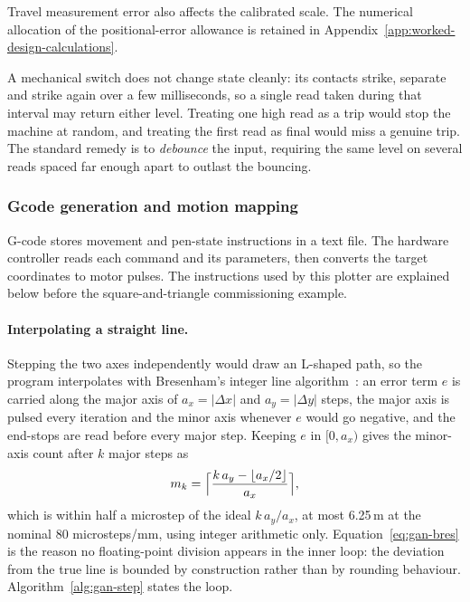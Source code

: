 Travel measurement error also affects the calibrated scale. The numerical allocation of the positional-error allowance is retained in Appendix~\ref{app:worked-design-calculations}.

A mechanical switch does not change state cleanly: its contacts strike, separate and strike again over a few milliseconds, so a single read taken during that interval may return either level. Treating one high read as a trip would stop the machine at random, and treating the first read as final would miss a genuine trip. The standard remedy is to \emph{debounce} the input, requiring the same level on several reads spaced far enough apart to outlast the bouncing.
\subsubsection{Gcode generation and motion mapping}
\label{sec:des-drive}
G-code stores movement and pen-state instructions in a text file. The hardware controller reads each command and its parameters, then converts the target coordinates to motor pulses. The instructions used by this plotter are explained below before the square-and-triangle commissioning example.

\paragraph{Interpolating a straight line.}
Stepping the two axes independently would draw an L-shaped path, so the program interpolates with Bresenham's integer line algorithm~\cite[p.~28]{bresenham1965}: an error term $e$ is carried along the major axis of $a_x=|\Delta x|$ and $a_y=|\Delta y|$ steps, the major axis is pulsed every iteration and the minor axis whenever $e$ would go negative, and the end-stops are read before every major step. Keeping $e$ in $[0,a_x)$ gives the minor-axis count after $k$ major steps as
\begin{equation}
m_k=\Bigl\lceil\frac{k\,a_y-\lfloor a_x/2\rfloor}{a_x}\Bigr\rceil,
\label{eq:gan-bres}
\end{equation}
which is within half a microstep of the ideal $k\,a_y/a_x$, at most 6.25\,\textmu m at the nominal 80 microsteps/mm, using integer arithmetic only. Equation~\ref{eq:gan-bres} is the reason no floating-point division appears in the inner loop: the deviation from the true line is bounded by construction rather than by rounding behaviour. Algorithm~\ref{alg:gan-step} states the loop.

